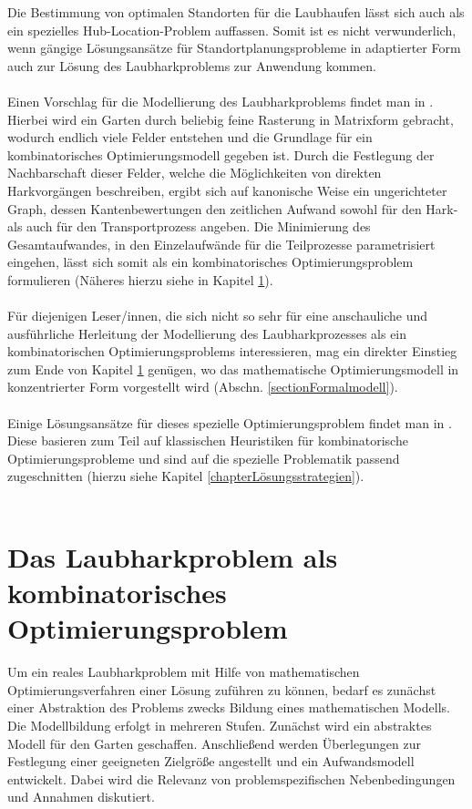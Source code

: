 \documentclass[fontsize=12pt,doubleside,openany,listof=totoc,listof=flat,listof=nochaptergap,numbers=noenddot]{scrbook}
\theoremstyle{style}
\begin{document}
 \noindent 
Die Bestimmung von optimalen Standorten für die Laubhaufen lässt sich auch als ein spezielles Hub-Location-Problem auffassen. Somit ist es nicht verwunderlich, wenn gängige Lösungsansätze für Standortplanungsprobleme in adaptierter Form auch zur Lösung des Laubharkproblems zur Anwendung kommen.\\
\\
Einen Vorschlag für die Modellierung des Laubharkproblems findet man in \cite{kruse}. Hierbei wird ein Garten durch beliebig feine Rasterung in Matrixform gebracht, wodurch endlich viele Felder entstehen und die Grundlage für ein kombinatorisches Optimierungsmodell gegeben ist. Durch die Festlegung der Nachbarschaft dieser Felder, welche die Möglichkeiten von direkten Harkvorgängen beschreiben, ergibt sich auf kanonische Weise ein ungerichteter Graph, dessen Kantenbewertungen den zeitlichen Aufwand sowohl für den Hark- als auch für den Transportprozess angeben. Die Minimierung des Gesamtaufwandes, in den Einzelaufwände für die Teilprozesse parametrisiert eingehen, lässt sich somit als ein kombinatorisches Optimierungsproblem formulieren (Näheres hierzu siehe in Kapitel \ref{chapterProblembeschreibung}). \\
\\
\noindent Für diejenigen Leser/innen, die sich nicht so sehr für eine anschauliche und ausführliche Herleitung der Modellierung des Laubharkprozesses als ein kombinatorischen Optimierungsproblems interessieren, mag ein direkter Einstieg zum Ende von Kapitel \ref{chapterProblembeschreibung} genügen, wo das mathematische Optimierungsmodell in konzentrierter Form vorgestellt wird (Abschn. \ref{sectionFormalmodell}). \\
\\
Einige Lösungsansätze für dieses spezielle Optimierungsproblem findet man in \cite{kruse_et_al}.
Diese basieren zum Teil auf klassischen Heuristiken für kombinatorische Optimierungsprobleme und sind auf die spezielle Problematik passend zugeschnitten (hierzu siehe Kapitel \ref{chapterLösungsstrategien}).\\
\\


\chapter{Das Laubharkproblem als kombinatorisches Optimierungsproblem}
\label{chapterProblembeschreibung}

Um ein reales Laubharkproblem mit Hilfe von mathematischen 
Optimierungsverfahren einer Lösung zuführen zu können, bedarf es zunächst einer 
Abstraktion des Problems zwecks Bildung eines mathematischen Modells. 
Die Modellbildung erfolgt in mehreren Stufen. Zunächst wird ein abstraktes 
Modell für den Garten geschaffen. Anschließend werden Überlegungen zur Festlegung 
einer geeigneten Zielgröße angestellt und ein Aufwandsmodell entwickelt. Dabei wird die Relevanz von problemspezifischen Nebenbedingungen und Annahmen diskutiert.
\end{document}
